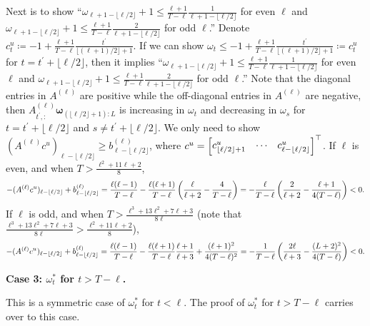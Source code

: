 			Next is to show ``$\omega_{\ell+1 - \lfloor \ell/2 \rfloor} +1 \leq \frac{\ell+1}{T - \ell} \frac{1}{\ell+1 - \lfloor \ell/2\rfloor}$ for even $\ell$ and $\omega_{\ell+1 - \lfloor \ell/2 \rfloor} +1 \leq \frac{\ell+1}{T - \ell} \frac{2}{\ell+1 - \lfloor \ell/2\rfloor}$ for odd $\ell$.'' Denote $c^u_t \coloneqq -1 + \frac{\ell+1}{T - \ell} \frac{t^\prime}{\lfloor (\ell+1)/2 \rfloor+1} $. If we can show $\omega_t \leq -1 + \frac{\ell+1}{T - \ell} \frac{t^\prime}{\lfloor (\ell+1)/2 \rfloor+1} \coloneqq c^u_t$ for $t = t^\prime + \lfloor \ell/2 \rfloor$, then it implies ``$\omega_{\ell+1 - \lfloor \ell/2 \rfloor} +1 \leq \frac{\ell+1}{T - \ell} \frac{1}{\ell+1 - \lfloor \ell/2\rfloor}$ for even $\ell$ and $\omega_{\ell+1 - \lfloor \ell/2 \rfloor} +1 \leq \frac{\ell+1}{T - \ell} \frac{2}{\ell+1 - \lfloor \ell/2\rfloor}$ for odd $\ell$.'' Note that the diagonal entries in $A^{(\ell)}$ are positive while the off-diagonal entries in $A^{(\ell)}$ are negative, then $A_{t^\prime, :}^{(\ell)} \bm{\omega}_{(\lfloor \ell/2 \rfloor+1): L}$ is increasing in $\omega_{t}$ and decreasing in $\omega_s$ for $t = t^\prime+ \lfloor \ell/2 \rfloor$ and $s \neq t^\prime+ \lfloor \ell/2 \rfloor $.  We only need to show $ (A^{(\ell)} c^u)_{\ell-\lfloor \ell/2 \rfloor} \geq b^{(\ell)}_{\ell-\lfloor \ell/2 \rfloor}$, where $c^u = \begin{bmatrix}
			c^u_{\lfloor \ell/2 \rfloor+1} & \cdots & c^u_{\ell- \lfloor \ell/2 \rfloor}
			\end{bmatrix}^\top $. If $\ell$ is even, and when $T > \frac{\ell^2 + 11\ell + 2}{8}$,
			\[  -(A^{(\ell)} c^u)_{\ell-\lfloor \ell/2 \rfloor} + b^{(\ell)}_{\ell-\lfloor \ell/2 \rfloor} = \frac{\ell(\ell-1)}{T - \ell} - \frac{\ell(\ell+1)}{T - \ell} \left( \frac{\ell}{\ell+2} - \frac{4}{T - \ell} \right) = - \frac{\ell}{T - \ell} \left( \frac{2}{\ell+2} - \frac{\ell+1}{4(T - \ell)} \right)  < 0. \]
			If $\ell$ is odd, and when $T > \frac{\ell^3+13\ell^2+7\ell+3}{8\ell}$ (note that $\frac{\ell^3+13\ell^2+7\ell+3}{8\ell} > \frac{\ell^2 + 11\ell + 2}{8}$), 
			\[-(A^{(\ell)} c^u)_{\ell-\lfloor \ell/2 \rfloor} + b^{(\ell)}_{\ell-\lfloor \ell/2 \rfloor} =  \frac{\ell(\ell-1)}{T - \ell} - \frac{\ell(\ell+1)}{T - \ell} \frac{\ell+1}{\ell+3} + \frac{(\ell+1)^2}{4(T - \ell)^2} = - \frac{1}{T - \ell} \left( \frac{2\ell}{\ell+3} - \frac{(L+2)^2}{4(T - \ell)} \right) < 0.\]
			
			
			
			
    \textbf{Case 3: $\omega_t^\ast$ for $t > T - \ell$.}	
 
    This is a symmetric case of $\omega_t^\ast$ for $t < \ell$. The proof of $\omega_t^\ast$ for $t > T - \ell$ carries over to this case. 
    
